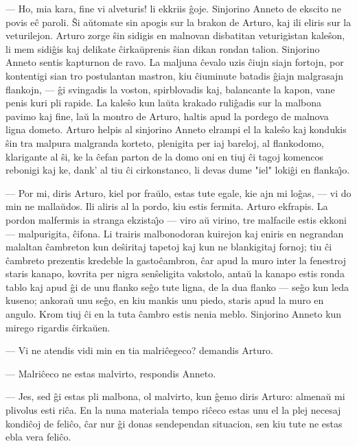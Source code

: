  --- Ho, mia kara, fine vi alveturis! li ekkriis \^goje. Sinjorino
Anneto de ekscito ne povis e\^c paroli. \^Si a\u utomate sin apogis
sur la brakon de Arturo, kaj ili eliris sur la veturilejon. Arturo
zorge \^sin sidigis en malnovan disbatitan veturigistan kale\^son,
li mem sidi\^gis kaj delikate \^cirka\u uprenis \^sian dikan rondan
talion. Sinjorino Anneto sentis kapturnon de ravo. La maljuna
\^cevalo uzis \^ciujn siajn fortojn, por kontentigi sian tro
postulantan mastron, kiu \^ciuminute batadis \^giajn malgrasajn
flankojn, --- \^gi svingadis la voston, spirblovadis kaj, balancante
la kapon, vane penis kuri pli rapide. La kale\^so kun la\u uta
krakado ruli\^gadis sur la malbona pavimo kaj fine, la\u u la montro
de Arturo, haltis apud la pordego de malnova ligna dometo. Arturo
helpis al sinjorino Anneto elrampi el la kale\^so kaj kondukis \^sin
tra malpura malgranda korteto, plenigita per iaj bareloj, al
flankodomo, klarigante al \^si, ke la \^cefan parton de la domo oni
en tiuj \^ci tagoj komencos rebonigi kaj ke, dank' al tiu \^ci
cirkonstanco, li devas dume "iel" loki\^gi en flanka\^{\j}o.

 --- Por mi, diris Arturo, kiel por fra\u ulo, estas tute egale, kie ajn
mi lo\^gas, --- vi do min ne malla\u udos. Ili aliris al la pordo,
kiu estis fermita. Arturo ekfrapis. La pordon malfermis ia stranga
ekzista\^{\j}o --- viro a\u u virino, tre malfacile estis ekkoni
--- malpurigita, \^cifona. Li trairis malbonodoran kuirejon kaj
eniris en negrandan malaltan \^cambreton kun de\^siritaj tapetoj kaj
kun ne blankigitaj fornoj; tiu \^ci \^cambreto prezentis kredeble la
gasto\^cambron, \^car apud la muro inter la fenestroj staris kanapo,
kovrita per nigra sen\^seligita vakstolo, anta\u u la kanapo estis
ronda tablo kaj apud \^gi de unu flanko se\^go tute ligna, de la dua
flanko --- se\^go kun leda kuseno; ankora\u u unu se\^go, en kiu
mankis unu piedo, staris apud la muro en angulo. Krom tiuj \^ci en
la tuta \^cambro estis nenia meblo. Sinjorino Anneto kun mirego
rigardis \^cirka\u uen.

 --- Vi ne atendis vidi min en tia malri\^cegeco? demandis Arturo.

 --- Malri\^ceco ne estas malvirto, respondis Anneto.

 --- Jes, sed \^gi estas pli malbona, ol malvirto, kun \^gemo diris
Arturo: almena\u u mi plivolus esti ri\^ca. En la nuna materiala
tempo ri\^ceco estas unu el la plej necesaj kondi\^coj de feli\^co,
\^car nur \^gi donas sendependan situacion, sen kiu tute ne estas
ebla vera feli\^co.

